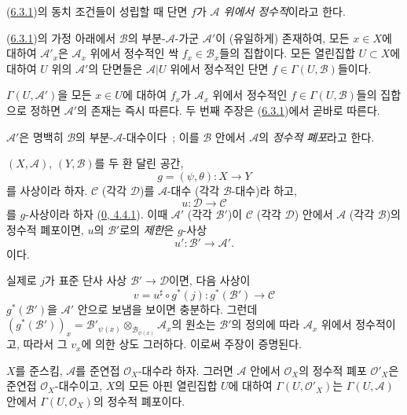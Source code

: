 (\hyperref[II.6.3.1-ko]{6.3.1})의 동치 조건들이 성립할 때 단면 $f$가
\emph{$\mathcal{A}$ 위에서 정수적}이라고 한다.

\begin{corollary}[6.3.2]
\label{II.6.3.2-ko}
(\hyperref[II.6.3.1-ko]{6.3.1})의 가정 아래에서 $\mathcal{B}$의
부분-$\mathcal{A}$-가군 $\mathcal{A}'$이 (유일하게) 존재하여, 모든
$x\in X$에 대하여 $\mathcal{A}'_x$은 $\mathcal{A}_x$ 위에서 정수적인
싹 $f_x\in\mathcal{B}_x$들의 집합이다. 모든 열린집합 $U\subset X$에
대하여 $U$ 위의 $\mathcal{A}'$의 단면들은 $\mathcal{A}|U$ 위에서
정수적인 단면 $f\in\Gamma(U,\mathcal{B})$들이다.
\end{corollary}

$\Gamma(U,\mathcal{A}')$을 모든 $x\in U$에 대하여 $f_x$가
$\mathcal{A}_x$ 위에서 정수적인 $f\in\Gamma(U,\mathcal{B})$들의 집합으로
정하면 $\mathcal{A}'$의 존재는 즉시 따른다. 두 번째 주장은
(\hyperref[II.6.3.1-ko]{6.3.1})에서 곧바로 따른다.

$\mathcal{A}'$은 명백히 $\mathcal{B}$의 부분-$\mathcal{A}$-대수이다~;
이를 $\mathcal{B}$ 안에서 $\mathcal{A}$의 \emph{정수적 폐포}라고 한다.

\begin{env}[6.3.3]
\label{II.6.3.3-ko}
$(X,\mathcal{A})$, $(Y,\mathcal{B})$를 두 환 달린 공간,
\[
g=(\psi,\theta):X\to Y
\]
를 사상이라 하자. $\mathcal{C}$ (각각 $\mathcal{D}$)를
$\mathcal{A}$-대수 (각각 $\mathcal{B}$-대수)라 하고,
\[
u:\mathcal{D}\to\mathcal{C}
\]
를 $g$-사상이라 하자 (\hyperref[0.4.4.1-ko]{0, 4.4.1}). 이때
$\mathcal{A}'$ (각각 $\mathcal{B}'$)이 $\mathcal{C}$ (각각
$\mathcal{D}$) 안에서 $\mathcal{A}$ (각각 $\mathcal{B}$)의 정수적
폐포이면, $u$의 $\mathcal{B}'$로의 \emph{제한}은 $g$-사상
\[
u':\mathcal{B}'\to\mathcal{A}'.
\]
이다.

실제로 $j$가 표준 단사 사상 $\mathcal{B}'\to\mathcal{D}$이면, 다음 사상이
\[
v=u^\sharp\circ g^*(j):g^*(\mathcal{B}')\to\mathcal{C}
\]
$g^*(\mathcal{B}')$을 $\mathcal{A}'$ 안으로 보냄을 보이면 충분하다. 그런데
$(g^*(\mathcal{B}'))_x=\mathcal{B}'_{\psi(x)}\otimes_{\mathcal{B}_{\psi(x)}}
\mathcal{A}_x$의 원소는 $\mathcal{B}'$의 정의에 따라
$\mathcal{A}_x$ 위에서 정수적이고, 따라서 그 $v_x$에 의한 상도 그러하다.
이로써 주장이 증명된다.
\end{env}

\begin{proposition}[6.3.4]
\label{II.6.3.4-ko}
$X$를 준스킴, $\mathcal{A}$를 준연접 $\mathcal{O}_X$-대수라 하자.
그러면 $\mathcal{A}$ 안에서 $\mathcal{O}_X$의 정수적 폐포
$\mathcal{O}'_X$은 준연접 $\mathcal{O}_X$-대수이고, $X$의 모든 아핀
열린집합 $U$에 대하여 $\Gamma(U,\mathcal{O}'_X)$는
$\Gamma(U,\mathcal{A})$ 안에서 $\Gamma(U,\mathcal{O}_X)$의 정수적
폐포이다.
\end{proposition}

